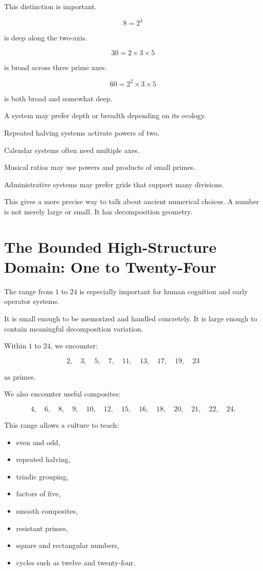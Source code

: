 \documentclass[11pt]{book}
\begin{document}
This distinction is important.

\[
8 = 2^3
\]

is deep along the two-axis.

\[
30 = 2 \times 3 \times 5
\]

is broad across three prime axes.

\[
60 = 2^2 \times 3 \times 5
\]

is both broad and somewhat deep.

A system may prefer depth or breadth depending on its ecology.

Repeated halving systems activate powers of two.

Calendar systems often need multiple axes.

Musical ratios may use powers and products of small primes.

Administrative systems may prefer grids that support many divisions.

This gives a more precise way to talk about ancient numerical choices. A number is not merely large or small. It has decomposition geometry.

\section{The Bounded High-Structure Domain: One to Twenty-Four}

The range from \(1\) to \(24\) is especially important for human cognition and early operator systems.

It is small enough to be memorized and handled concretely. It is large enough to contain meaningful decomposition variation.

Within \(1\) to \(24\), we encounter:

\[
2,\quad 3,\quad 5,\quad 7,\quad 11,\quad 13,\quad 17,\quad 19,\quad 23
\]

as primes.

We also encounter useful composites:

\[
4,\quad 6,\quad 8,\quad 9,\quad 10,\quad 12,\quad 15,\quad 16,\quad 18,\quad 20,\quad 21,\quad 22,\quad 24.
\]

This range allows a culture to teach:

\begin{itemize}
    \item even and odd,
    \item repeated halving,
    \item triadic grouping,
    \item factors of five,
    \item smooth composites,
    \item resistant primes,
    \item square and rectangular numbers,
    \item cycles such as twelve and twenty-four.
\end{itemize}
\end{document}
